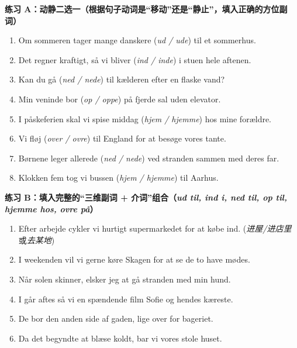 \textbf{练习 A：动静二选一（根据句子动词是“移动”还是“静止”，填入正确的方位副词）}
\begin{enumerate}
  \item Om sommeren tager mange danskere \underline{\hspace{1.8cm}} (\textit{ud / ude}) til et sommerhus.
  \item Det regner kraftigt, så vi bliver \underline{\hspace{1.8cm}} (\textit{ind / inde}) i stuen hele aftenen.
  \item Kan du gå \underline{\hspace{1.8cm}} (\textit{ned / nede}) til kælderen efter en flaske vand?
  \item Min veninde bor \underline{\hspace{1.8cm}} (\textit{op / oppe}) på fjerde sal uden elevator.
  \item I påskeferien skal vi spise middag \underline{\hspace{1.8cm}} (\textit{hjem / hjemme}) hos mine forældre.
  \item Vi fløj \underline{\hspace{1.8cm}} (\textit{over / ovre}) til England for at besøge vores tante.
  \item Børnene leger allerede \underline{\hspace{1.8cm}} (\textit{ned / nede}) ved stranden sammen med deres far.
  \item Klokken fem tog vi bussen \underline{\hspace{1.8cm}} (\textit{hjem / hjemme}) til Aarhus.
\end{enumerate}

\textbf{练习 B：填入完整的“三维副词 + 介词”组合（\textit{ud til, ind i, ned til, op til, hjemme hos, ovre på}）}
\begin{enumerate}
  \item Efter arbejde cykler vi hurtigt \underline{\hspace{2.4cm}} supermarkedet for at købe ind. (\textit{进屋/进店里}或\textit{去某地})
  \item I weekenden vil vi gerne køre \underline{\hspace{2.4cm}} Skagen for at se de to have mødes.
  \item Når solen skinner, elsker jeg at gå \underline{\hspace{2.4cm}} stranden med min hund.
  \item I går aftes så vi en spændende film \underline{\hspace{2.4cm}} Sofie og hendes kæreste.
  \item De bor \underline{\hspace{2.4cm}} den anden side af gaden, lige over for bageriet.
  \item Da det begyndte at blæse koldt, bar vi vores stole \underline{\hspace{2.4cm}} huset.
\end{enumerate}


